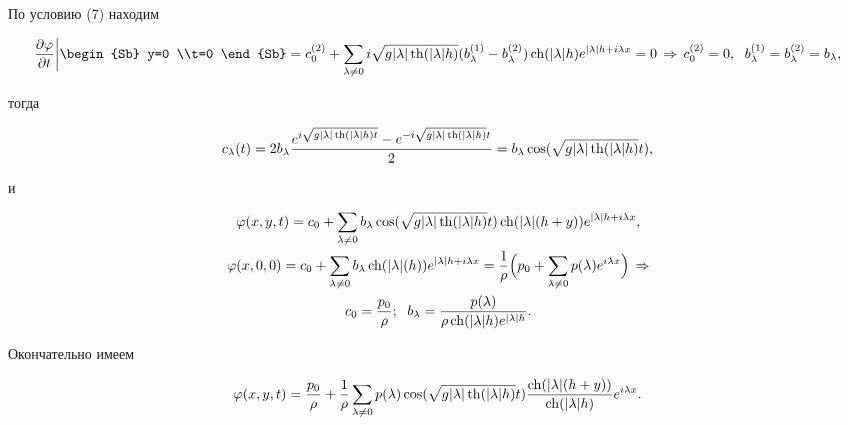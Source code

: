По условию (7) находим 


$$ 


\frac{\partial\varphi}{\partial t}\bigg|\begin{Sb} 


y=0 \\t=0 \end{Sb}=c^{(2)}_0+\sum_{\lambda\ne0} 


i\sqrt{g|\lambda|\th(|\lambda|h)}(b^{(1)}_\lambda- 


b^{(2)}_\lambda)\ch(|\lambda|h)e^{|\lambda|h+i\lambda x}=0\, 


\Rightarrow\, c^{(2)}_0=0,\ \; b^{(1)}_\lambda=b^{(2)}_\lambda= 


b_\lambda, 


$$ 


тогда 


$$ 


c_\lambda(t)=2b_\lambda 


\frac{e^{i\sqrt{g|\lambda|\th(|\lambda|h)t}}- 


e^{-i\sqrt{g|\lambda|\th(|\lambda|h)}t}}{2}= 


b_\lambda\cos(\sqrt{g|\lambda|\th(|\lambda|h)}t), 


$$ 


и 


\begin{gather*} 


\varphi(x,y,t)=c_0+\sum_{\lambda\ne0}b_\lambda\cos 


(\sqrt{g|\lambda|\th(|\lambda|h)}t)\ch 


(|\lambda|(h+y))e^{|\lambda|h+i\lambda x}, \\ 


% 


\varphi(x,0,0)=c_0+\sum_{\lambda\ne0}b_\lambda\ch 


(|\lambda|(h))e^{|\lambda|h+i\lambda x}=\frac{1}{\rho} 


\Big(p_0+\sum_{\lambda\ne0}p(\lambda)e^{i\lambda x}\Big)\,\Rightarrow\\ 


% 


c_0=\frac{p_0}{\rho};\ \; b_\lambda=\frac{p(\lambda)} 


{\rho\ch(|\lambda|h)e^{|\lambda|h}}. 


\end{gather*} 


Окончательно имеем 


\begin{equation} 


\varphi(x,y,t)=\frac{p_0}{\rho}+\frac{1}{\rho} 


\sum_{\lambda\ne0}p(\lambda)\cos 


(\sqrt{g|\lambda|\th(|\lambda|h)}t) 


\frac{\ch(|\lambda|(h+y))}{\ch(|\lambda|h)}e^{i\lambda x}. 


\end{equation} 


